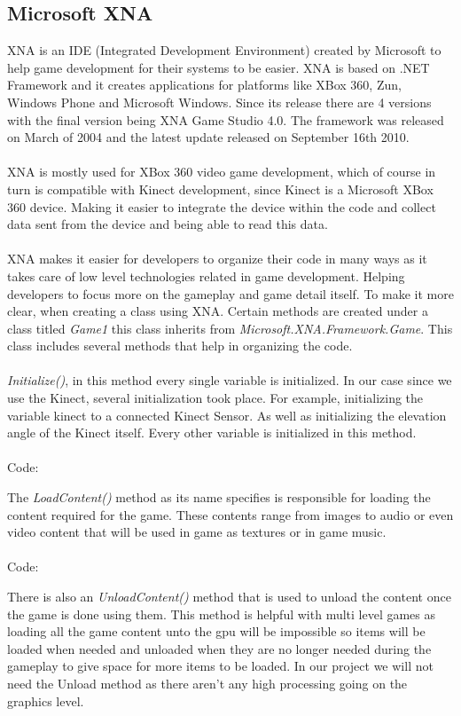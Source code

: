 \subsection{Microsoft XNA}
XNA is an IDE (Integrated Development Environment) created by Microsoft to help game development for their systems to be easier. XNA is based on .NET Framework and it creates applications for platforms like XBox 360, Zun, Windows Phone and Microsoft Windows. Since its release there are 4 versions with the final version being XNA Game Studio 4.0. The framework was released on March of 2004 and the latest update released on September 16th 2010.
\\
\\
XNA is mostly used for XBox 360 video game development, which of course in turn is compatible with Kinect development, since Kinect is a Microsoft XBox 360 device. Making it easier to integrate the device within the code and collect data sent from the device and being able to read this data.
\\
\\
XNA makes it easier for developers to organize their code in many ways as it takes care of low level technologies related in game development. Helping developers to focus more on the gameplay and game detail itself. To make it more clear, when creating a class using XNA. Certain methods are created under a class titled \emph{Game1} this class inherits from \emph{Microsoft.XNA.Framework.Game}. This class includes several methods that help in organizing the code.
\\
\\
\emph{Initialize()}, in this method every single variable is initialized. In our case since we use the Kinect, several initialization took place. For example, initializing the variable kinect to a connected Kinect Sensor. As well as initializing the elevation angle of the Kinect itself. Every other variable is initialized in this method.
\\
\\
Code:
 
The \emph{LoadContent()} method as its name specifies is responsible for loading the content required for the game. These contents range from images to audio or even video content that will be used in game as textures or in game music.
\\
\\
Code:
 
There is also an \emph{UnloadContent()} method that is used to unload the content once the game is done using them. This method is helpful with multi level games as loading all the game content unto the gpu will be impossible so items will be loaded when needed and unloaded when they are no longer needed during the gameplay to give space for more items to be loaded. In our project we will not need the Unload method as there aren't any high processing going on the graphics level.
